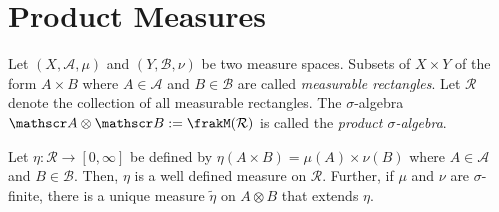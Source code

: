 \section{Product Measures}

\begin{definition}
    Let $(X,\mathscr A,\mu)$ and $(Y,\mathscr B, \nu)$ be two measure spaces. Subsets of $X\times Y$ of the form $A\times B$ where $A\in\mathscr A$ and $B\in\mathscr B$ are called \textit{measurable rectangles}. Let $\mathcal R$ denote the collection of all measurable rectangles. The $\sigma$-algebra $\mathscr A\otimes\mathscr B := \frakM(\mathcal R)$ is called the \textit{product $\sigma$-algebra}.
\end{definition}

\begin{theorem}
    Let $\eta:\mathcal R\to[0,\infty]$ be defined by $\eta(A\times B) = \mu(A)\times\nu(B)$ where $A\in\mathscr A$ and $B\in\mathscr B$. Then, $\eta$ is a well defined measure on $\mathcal R$. Further, if $\mu$ and $\nu$ are $\sigma$-finite, there is a unique measure $\widetilde\eta$ on $A\otimes B$ that extends $\eta$.
\end{theorem}
